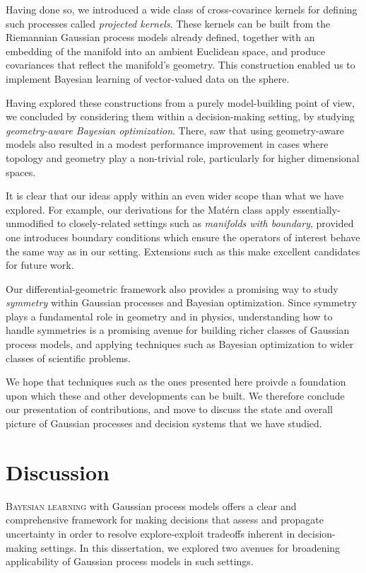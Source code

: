 \documentclass[11pt]{book}
\begin{document}
Having done so, we introduced a wide class of cross-covarince kernels for defining such processes called \emph{projected kernels}.
These kernels can be built from the Riemannian Gaussian process models already defined, together with an embedding of the manifold into an ambient Euclidean space, and produce covariances that reflect the manifold's geometry.
This construction enabled us to implement Bayesian learning of vector-valued data on the sphere.

Having explored these constructions from a purely model-building point of view, we concluded by considering them within a decision-making setting, by studying \emph{geometry-aware Bayesian optimization}.
There, saw that using geometry-aware models also resulted in a modest performance improvement in cases where topology and geometry play a non-trivial role, particularly for higher dimensional spaces.

It is clear that our ideas apply within an even wider scope than what we have explored.
For example, our derivations for the Matérn class apply essentially-unmodified to closely-related settings such as \emph{manifolds with boundary}, provided one introduces boundary conditions which ensure the operators of interest behave the same way as in our setting.
Extensions such as this make excellent candidates for future work.

Our differential-geometric framework also provides a promising way to study \emph{symmetry} within Gaussian processes and Bayesian optimization.
Since symmetry plays a fundamental role in geometry and in physics, understanding how to handle symmetries is a promising avenue for building richer classes of Gaussian process models, and applying techniques such as Bayesian optimization to wider classes of scientific problems.

We hope that techniques such as the ones presented here proivde a foundation upon which these and other developments can be built.
We therefore conclude our presentation of contributions, and move to discuss the state and overall picture of Gaussian processes and decision systems that we have studied.





\chapter{Discussion}
\label{ch:discussion}

\lettrine{B}{ayesian learning} with Gaussian process models offers a clear and comprehensive framework for making decisions that assess and propagate uncertainty in order to resolve explore-exploit tradeoffs inherent in decision-making settings.
In this dissertation, we explored two avenues for broadening applicability of Gaussian process models in such settings.
\end{document}

